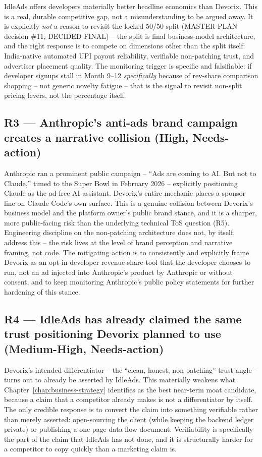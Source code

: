 IdleAds offers developers materially better headline economics than Devorix. This is a real, durable competitive gap, not a misunderstanding to be argued away. It is explicitly \emph{not} a reason to revisit the locked 50/50 split (MASTER-PLAN decision \#11, DECIDED FINAL) -- the split is final business-model architecture, and the right response is to compete on dimensions other than the split itself: India-native automated UPI payout reliability, verifiable non-patching trust, and advertiser placement quality. The monitoring trigger is specific and falsifiable: if developer signups stall in Month 9--12 \emph{specifically} because of rev-share comparison shopping -- not generic novelty fatigue -- that is the signal to revisit non-split pricing levers, not the percentage itself.

\subsection{R3 --- Anthropic's anti-ads brand campaign creates a narrative collision (High, Needs-action)}

Anthropic ran a prominent public campaign -- ``Ads are coming to AI. But not to Claude,'' timed to the Super Bowl in February 2026 -- explicitly positioning Claude as the ad-free AI assistant. Devorix's entire mechanic places a sponsor line on Claude Code's own surface. This is a genuine collision between Devorix's business model and the platform owner's public brand stance, and it is a sharper, more public-facing risk than the underlying technical ToS question (R5). Engineering discipline on the non-patching architecture does not, by itself, address this -- the risk lives at the level of brand perception and narrative framing, not code. The mitigating action is to consistently and explicitly frame Devorix as an opt-in developer revenue-share tool that the developer chooses to run, not an ad injected into Anthropic's product by Anthropic or without consent, and to keep monitoring Anthropic's public policy statements for further hardening of this stance.

\subsection{R4 --- IdleAds has already claimed the same trust positioning Devorix planned to use (Medium-High, Needs-action)}

Devorix's intended differentiator -- the ``clean, honest, non-patching'' trust angle -- turns out to already be asserted by IdleAds. This materially weakens what Chapter~\ref{chap:business-strategy} identifies as the best near-term moat candidate, because a claim that a competitor already makes is not a differentiator by itself. The only credible response is to convert the claim into something verifiable rather than merely asserted: open-sourcing the client (while keeping the backend ledger private) or publishing a one-page data-flow document. Verifiability is specifically the part of the claim that IdleAds has not done, and it is structurally harder for a competitor to copy quickly than a marketing claim is.

